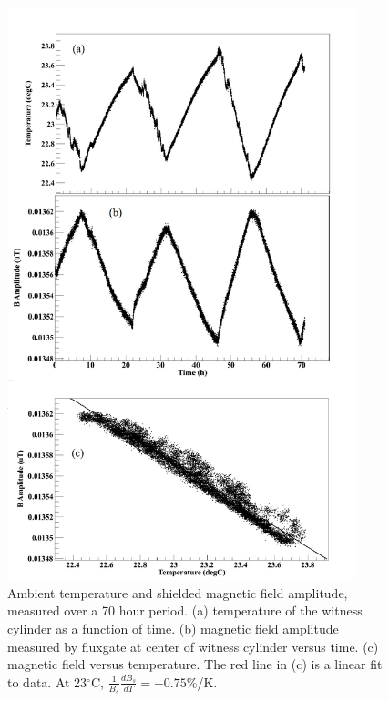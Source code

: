 \begin{figure}
\begin{center}
   \includegraphics[width=0.9\textwidth]{B_vs_T_solenoid.png}
    \caption{Ambient temperature and shielded magnetic field
      amplitude, measured over a 70 hour period. (a) temperature of
      the witness cylinder as a function of time.  (b) magnetic field
      amplitude measured by fluxgate at center of witness cylinder
      versus time.  (c) magnetic field versus temperature. The red
      line in (c) is a linear fit to data. At 23$^\circ$C,
      $\frac{1}{B_s}\frac{dB_s}{dT}=-0.75\%$/K.}
    \label{fig:B_vs_Temp}
    \end{center}
\end{figure} 


